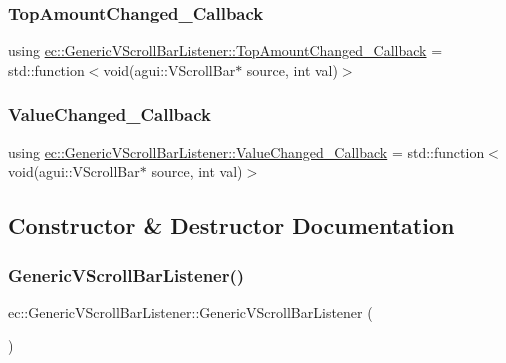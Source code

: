 \subsubsection{\texorpdfstring{Top\+Amount\+Changed\+\_\+\+Callback}{TopAmountChanged\_Callback}}
{\footnotesize\ttfamily using \mbox{\hyperlink{classec_1_1_generic_v_scroll_bar_listener_af8bcd97ac937ea6fb151d93a419cd3a2}{ec\+::\+Generic\+V\+Scroll\+Bar\+Listener\+::\+Top\+Amount\+Changed\+\_\+\+Callback}} =  std\+::function$<$void(agui\+::\+V\+Scroll\+Bar$\ast$ source, int val)$>$}

\mbox{\label{classec_1_1_generic_v_scroll_bar_listener_ae6332f8564b656388c34e02b9ee05575}} 
\subsubsection{\texorpdfstring{Value\+Changed\+\_\+\+Callback}{ValueChanged\_Callback}}
{\footnotesize\ttfamily using \mbox{\hyperlink{classec_1_1_generic_v_scroll_bar_listener_ae6332f8564b656388c34e02b9ee05575}{ec\+::\+Generic\+V\+Scroll\+Bar\+Listener\+::\+Value\+Changed\+\_\+\+Callback}} =  std\+::function$<$void(agui\+::\+V\+Scroll\+Bar$\ast$ source, int val)$>$}



\subsection{Constructor \& Destructor Documentation}
\mbox{\label{classec_1_1_generic_v_scroll_bar_listener_a33f0ddbaa19ba19516d888626de96983}} 
\subsubsection{\texorpdfstring{Generic\+V\+Scroll\+Bar\+Listener()}{GenericVScrollBarListener()}}
{\footnotesize\ttfamily ec\+::\+Generic\+V\+Scroll\+Bar\+Listener\+::\+Generic\+V\+Scroll\+Bar\+Listener (\begin{DoxyParamCaption}{ }\end{DoxyParamCaption})\hspace{0.3cm}{\ttfamily [explicit]}}


